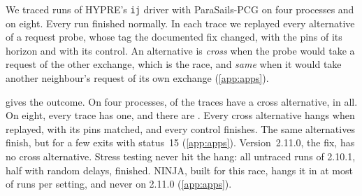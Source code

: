 We traced \nHypreFourRuns runs of HYPRE's \texttt{ij} driver with ParaSails-PCG on four
processes and \nHypreEightRuns on eight. Every run finished normally. In each trace we replayed
every alternative of a request probe, whose tag the documented fix changed, with the pins of its
horizon and with its control. An
alternative is \emph{cross} when the probe would take a request of the other exchange, which is
the race, and \emph{same} when it would take another neighbour's request of its own exchange
(\cref{app:apps}).

 gives the outcome. On four processes, \nHypreFourExposed of the
\nHypreFourRuns traces have a cross alternative, \nHypreFourAlts in all. On eight, every trace
has one, and there are \nHypreEightAlts. Every cross alternative hangs when replayed, with its pins
matched, and every control finishes. The same alternatives finish, but for a few exits with
status~15 (\cref{app:apps}). Version~2.11.0, the fix, has no cross alternative.
Stress testing never hit the hang: all \nHypreStressRuns untraced runs of
2.10.1, half with random delays, finished. NINJA, built for this race, hangs it in
at most \nNinjaHypreEightAppHangSetup of \nNinjaHypreEightAppRuns runs per setting, and never on
2.11.0 (\cref{app:apps}).

